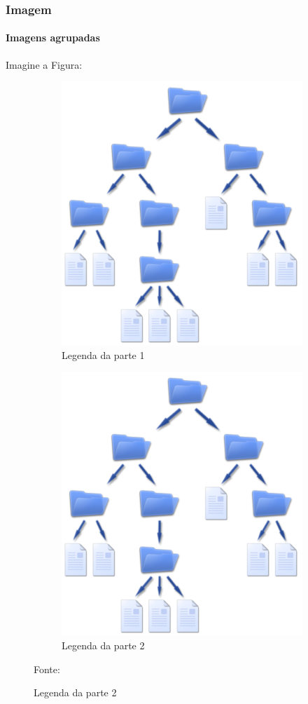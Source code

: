 \documentclass[aspectratio=169]{beamer}
\begin{document}
	\begin{frame}
		\frametitle{Imagem}
		\framesubtitle{Imagens agrupadas}
		Imagine a Figura:
		
		\begin{figure}[H]
			\centering
			\caption{Legenda da figura}
			\begin{subfigure}{0.45\textwidth}
				\centering
				\includegraphics[width=.25\linewidth]{sa.png}
				\caption{Legenda da parte 1}
				\label{figPt1}
			\end{subfigure}
			\hfill
			\begin{subfigure}{0.45\textwidth}
				\centering
				\includegraphics[width=.25\linewidth]{sa.png}
				\caption{Legenda da parte 2}
				\label{figPt2}
			\end{subfigure}                                                   
			
			\footnotesize{Fonte: }
			\label{figPt1e2}
		\end{figure}	
	\end{frame}
	
\end{document}
